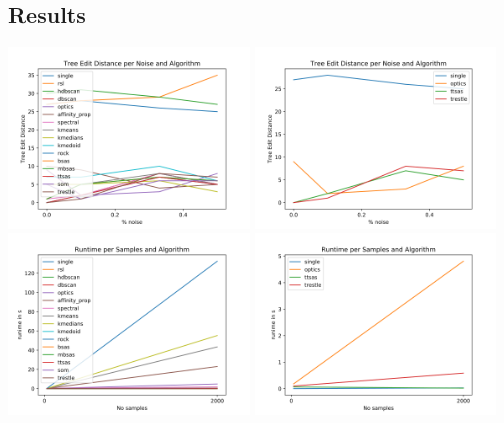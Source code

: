 \documentclass[rgb]{beamer}
\begin{document}
    \subsection{Results}
        \begin{frame}[allowframebreaks]
        \subsectionpage
            \centering \includegraphics[keepaspectratio,width=0.48\textwidth, height=\textheight]{graphics/aproaches/ted_results.png} \hspace{0.3cm}
            \includegraphics[keepaspectratio,width=0.48\textwidth, height=\textheight]{graphics/aproaches/ted_results_reduced.png} \\
            \framebreak
             \includegraphics[keepaspectratio,width=0.48\textwidth, height=\textheight]{graphics/aproaches/time_bench.png} \hspace{0.3cm}
             \includegraphics[keepaspectratio,width=0.48\textwidth, height=\textheight]{graphics/aproaches/time_bench_reduced.png} \\
        \end{frame}{}
\end{document}
